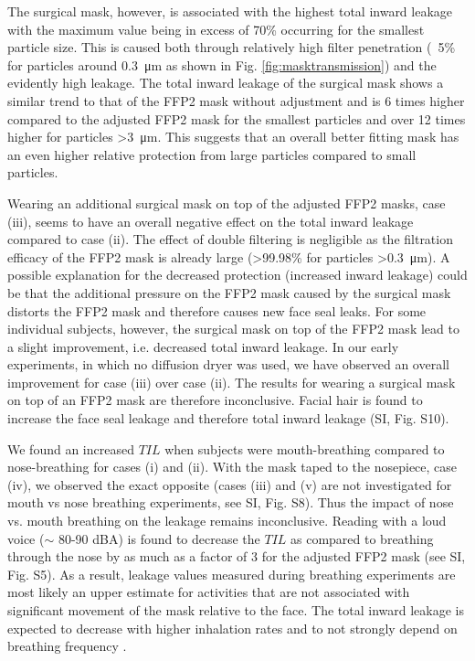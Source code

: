 \documentclass[preprint]{elsarticle}
\begin{document}
The surgical mask, however, is associated with the highest total inward leakage with the maximum value being in excess of 70\% occurring for the smallest particle size. This is caused both through relatively high filter penetration (~5\% for particles around \SI{0.3}{\micro \meter} as shown in Fig. \ref{fig:masktransmission}) and the evidently high leakage. The total inward leakage of the surgical mask shows a similar trend to that of the FFP2 mask without adjustment and is 6 times higher compared to the adjusted FFP2 mask for the smallest particles and over 12 times higher for particles \textgreater \SI{3}{\micro \meter}. This suggests that an overall better fitting mask has an even higher relative protection from large particles compared to small particles.

Wearing an additional surgical mask on top of the adjusted FFP2 masks, case (iii), seems to have an overall negative effect on the total inward leakage compared to case (ii). The effect of double filtering is negligible as the filtration efficacy of the FFP2 mask is already large (\textgreater 99.98\% for particles \textgreater \SI{0.3}{\micro\meter}). A possible explanation for the decreased protection (increased inward leakage) could be that the additional pressure on the FFP2 mask caused by the surgical mask distorts the FFP2 mask and therefore causes new face seal leaks. For some individual subjects, however, the surgical mask on top of the FFP2 mask lead to a slight improvement, i.e. decreased total inward leakage. In our early experiments, in which no diffusion dryer was used, we have observed an overall improvement for case (iii) over case (ii). The results for wearing a surgical mask on top of an FFP2 mask are therefore inconclusive. 
Facial hair is found to increase the face seal leakage and therefore total inward leakage (SI, Fig. S10).

We found an increased $TIL$ when subjects were mouth-breathing compared to nose-breathing for cases (i) and (ii). With the mask taped to the nosepiece, case (iv), we observed the exact opposite (cases (iii) and (v) are not investigated for mouth vs nose breathing experiments, see SI, Fig. S8). Thus the impact of nose vs. mouth breathing on the leakage remains inconclusive. Reading with a loud voice ($\sim$ 80-90 dBA) is found to decrease the $TIL$ as compared to breathing through the nose by as much as a factor of 3 for the adjusted FFP2 mask (see SI, Fig. S5). As a result, leakage values measured during breathing experiments are most likely an upper estimate for activities that are not associated with significant movement of the mask relative to the face.
The total inward leakage is expected to decrease with higher inhalation rates and to not strongly depend on breathing frequency \cite{he2013effect}.
\end{document}
